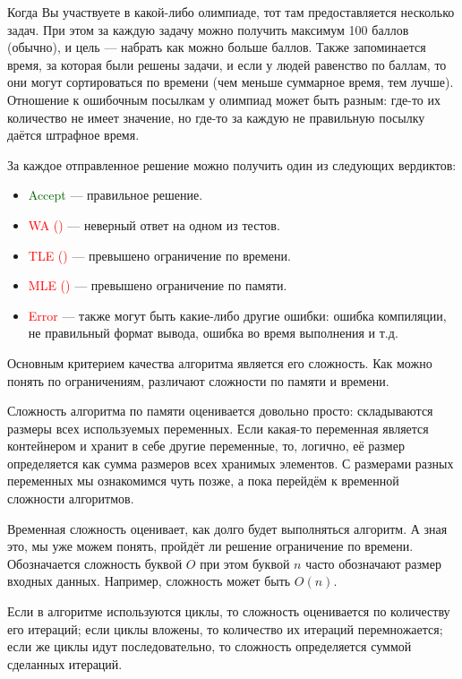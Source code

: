 Когда Вы участвуете в какой-либо олимпиаде, тот там предоставляется несколько задач. При этом за каждую задачу можно получить максимум 100 баллов (обычно), и цель — набрать как можно больше баллов. Также запоминается время, за которая были решены задачи, и если у людей равенство по баллам, то они могут сортироваться по времени (чем меньше суммарное время, тем лучше). Отношение к ошибочным посылкам у олимпиад может быть разным: где-то их количество не имеет значение, но где-то за каждую не правильную посылку даётся штрафное время.

За каждое отправленное решение можно получить один из следующих вердиктов:
\begin{itemize}
    \item \textcolor{darkgreen}{Accept} — правильное решение.
    \item \textcolor{red}{WA ()} — неверный ответ на одном из тестов.
    \item \textcolor{red}{TLE ()} — превышено ограничение по времени.
    \item \textcolor{red}{MLE ()} — превышено ограничение по памяти.
    \item \textcolor{red}{Error} — также могут быть какие-либо другие ошибки: ошибка компиляции, не правильный формат вывода, ошибка во время выполнения и т.д.
\end{itemize}

Основным критерием качества алгоритма является его сложность. Как можно понять по ограничениям, различают сложности по памяти и времени.

Сложность алгоритма по памяти оценивается довольно просто: складываются размеры всех используемых переменных. Если какая-то переменная является контейнером и хранит в себе другие переменные, то, логично, её размер определяется как сумма размеров всех хранимых элементов. С размерами разных переменных мы ознакомимся чуть позже, а пока перейдём к временной сложности алгоритмов.

Временная сложность оценивает, как долго будет выполняться алгоритм. А зная это, мы уже можем понять, пройдёт ли решение ограничение по времени. Обозначается сложность буквой $O$ при этом буквой $n$ часто обозначают размер входных данных. Например, сложность может быть $O(n)$.

Если в алгоритме используются циклы, то сложность оценивается по количеству его итераций; если циклы вложены, то количество их итераций перемножается; если же циклы идут последовательно, то сложность определяется суммой сделанных итераций.

